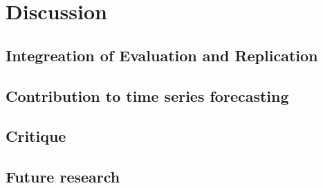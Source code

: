 \documentclass[letterpaper,twocolumn,11pt]{article}
\begin{document}
\section{Discussion}
\subsection{Integreation of Evaluation and Replication}
\subsection{Contribution to time series forecasting}
\subsection{Critique}
\subsection{Future research}

{\footnotesize 
}


\theendnotes
\end{document}
